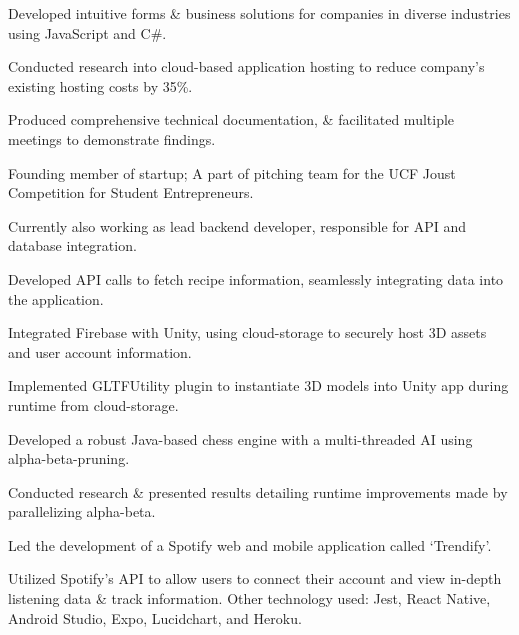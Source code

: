 \documentclass[]{deedy-resume-openfont}
\begin{document}
\begin{tightemize}
\item Developed intuitive forms \& business solutions for companies in diverse industries using JavaScript and C\#.
\item Conducted research into cloud-based application hosting to reduce company's existing hosting costs by 35\%.
\item Produced comprehensive technical documentation, \& facilitated multiple meetings to demonstrate findings.
\end{tightemize}



\begin{tightemize}
\item Founding member of startup; A part of pitching team for the UCF Joust Competition for Student Entrepreneurs. 
\item Currently also working as lead backend developer, responsible for API and database integration. 
\item Developed API calls to fetch recipe information, seamlessly integrating data into the application.
\item Integrated Firebase with Unity, using cloud-storage to securely host 3D assets and user account information.
\item Implemented GLTFUtility plugin to instantiate 3D models into Unity app during runtime from cloud-storage.
\end{tightemize}
\vspace{8pt}

\begin{tightemize}
\item Developed a robust Java-based chess engine with a multi-threaded AI using alpha-beta-pruning. 
\item Conducted research \& presented results detailing runtime improvements made by parallelizing alpha-beta.
\end{tightemize}
\sectionsep

\begin{tightemize}
\item Led the development of a Spotify web and mobile application called ‘Trendify’. 
\item Utilized Spotify’s API to allow users to connect their account and view in-depth listening data \& track information. Other technology used: Jest, React Native, Android Studio, Expo, Lucidchart, and Heroku.
\end{tightemize}
\end{document}
